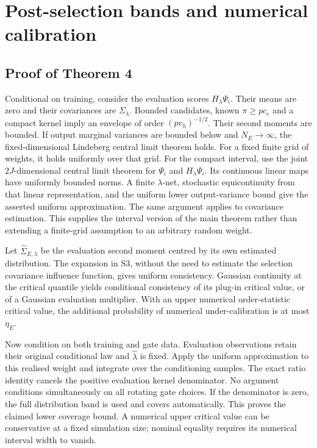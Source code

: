 \section{Post-selection bands and numerical calibration}
\subsection{Proof of Theorem 4}
Conditional on training, consider the evaluation scores $H_\lambda\Psi_i$. Their means are zero and their covariances are $\Sigma_\lambda$. Bounded candidates, known $\pi\geq pc_e$ and a compact kernel imply an envelope of order $(pv_h)^{-1/2}$. Their second moments are bounded. If output marginal variances are bounded below and $N_E\to\infty$, the fixed-dimensional Lindeberg central limit theorem holds. For a fixed finite grid of weights, it holds uniformly over that grid. For the compact interval, use the joint $2J$-dimensional central limit theorem for $\Psi_i$ and $H_\lambda\Psi_i$. Its continuous linear maps have uniformly bounded norms. A finite $\lambda$-net, stochastic equicontinuity from that linear representation, and the uniform lower output-variance bound give the asserted uniform approximation. The same argument applies to covariance estimation. This supplies the interval version of the main theorem rather than extending a finite-grid assumption to an arbitrary random weight.

Let $\widehat\Sigma_{E,\lambda}$ be the evaluation second moment centred by its own estimated distribution. The expansion in S3, without the need to estimate the selection covariance influence function, gives uniform consistency. Gaussian continuity at the critical quantile yields conditional consistency of its plug-in critical value, or of a Gaussian evaluation multiplier. With an upper numerical order-statistic critical value, the additional probability of numerical under-calibration is at most $\eta_E$.

Now condition on both training and gate data. Evaluation observations retain their original conditional law and $\widehat\lambda$ is fixed. Apply the uniform approximation to this realised weight and integrate over the conditioning samples. The exact ratio identity cancels the positive evaluation kernel denominator. No argument conditions simultaneously on all rotating gate choices. If the denominator is zero, the full distribution band is used and covers automatically. This proves the claimed lower coverage bound. A numerical upper critical value can be conservative at a fixed simulation size; nominal equality requires its numerical interval width to vanish.

